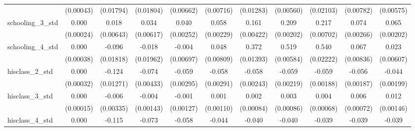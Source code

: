 {\begin{tabular}{l*{10}{c}}
                    &   (0.00043)         &   (0.01794)         &   (0.01804)         &   (0.00662)         &   (0.00716)         &   (0.01283)         &   (0.00560)         &   (0.02103)         &   (0.00782)         &   (0.00575)         \\
schooling\_3\_std     &       0.000         &       0.018\sym{**} &       0.034\sym{***}&       0.040\sym{***}&       0.058\sym{***}&       0.161\sym{***}&       0.209\sym{***}&       0.217\sym{***}&       0.074\sym{***}&       0.065\sym{***}\\
                    &   (0.00024)         &   (0.00643)         &   (0.00617)         &   (0.00252)         &   (0.00229)         &   (0.00422)         &   (0.00202)         &   (0.00702)         &   (0.00266)         &   (0.00202)         \\
schooling\_4\_std     &       0.000         &      -0.096\sym{***}&      -0.018         &      -0.004         &       0.048\sym{***}&       0.372\sym{***}&       0.519\sym{***}&       0.540\sym{***}&       0.067\sym{***}&       0.023\sym{***}\\
                    &   (0.00038)         &   (0.01818)         &   (0.01962)         &   (0.00697)         &   (0.00809)         &   (0.01393)         &   (0.00584)         &   (0.02222)         &   (0.00836)         &   (0.00607)         \\
hisclass\_2\_std      &       0.000         &      -0.124\sym{***}&      -0.074\sym{***}&      -0.059\sym{***}&      -0.058\sym{***}&      -0.058\sym{***}&      -0.059\sym{***}&      -0.059\sym{***}&      -0.056\sym{***}&      -0.044\sym{***}\\
                    &   (0.00032)         &   (0.01271)         &   (0.00433)         &   (0.00295)         &   (0.00291)         &   (0.00243)         &   (0.00219)         &   (0.00188)         &   (0.00187)         &   (0.00199)         \\
hisclass\_3\_std      &       0.000         &      -0.006         &      -0.004\sym{**} &      -0.001         &       0.001         &       0.002         &       0.003\sym{**} &       0.004\sym{***}&       0.006\sym{***}&       0.012\sym{***}\\
                    &   (0.00015)         &   (0.00335)         &   (0.00143)         &   (0.00127)         &   (0.00110)         &   (0.00084)         &   (0.00086)         &   (0.00068)         &   (0.00072)         &   (0.00146)         \\
hisclass\_4\_std      &       0.000         &      -0.115\sym{***}&      -0.073\sym{***}&      -0.058\sym{***}&      -0.044\sym{***}&      -0.040\sym{***}&      -0.040\sym{***}&      -0.039\sym{***}&      -0.039\sym{***}&      -0.039\sym{***}\\

\end{tabular}}
